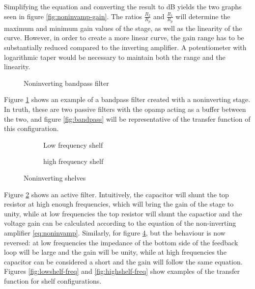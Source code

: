 Simplifying the equation and converting the result to dB yields the two graphs
seen in figure \ref{fig:noninvamp-gain}. The ratios $\frac{R_2}{R_p}$ and
$\frac{R_1}{R_p}$ will determine the maximum and minimum gain values of the
stage, as well as the linearity of the curve. However, in order to create a
more linear curve, the gain range has to be substantially reduced compared to
the inverting amplifier. A potentiometer with logarithmic taper would be
necessary to maintain both the range and the linearity.

\begin{figure}[H]
    \center
    
    \caption{Noninverting bandpass filter}
    \label{fig:noninvfilt}
\end{figure}

Figure \ref{fig:noninvfilt} shows an example of a bandpass filter created with
a noninverting stage. In truth, these are two passive filters with the opamp
acting as a buffer between the two, and figure \ref{fig:bandpass} will be
representative of the transfer function of this configuration.

\begin{figure}[H]
    \begin{subfigure}{\textwidth}
    \center
    
    \caption{Low frequency shelf}
    \label{fig:lowshelf}
    \end{subfigure}
    \begin{subfigure}{\textwidth}
    \center
    
    \caption{high frequency shelf}
    \label{fig:highshelf}
    \end{subfigure}
    \caption{Noninverting shelves}
\end{figure}

Figure \ref{fig:lowshelf} shows an active filter. Intuitively, the capacitor
will shunt the top resistor at high enough frequencies, which will bring the
gain of the stage to unity, while at low frequencies the top resistor will
shunt the capactior and the voltage gain can be calculated according to
the equation of the non-inverting amplifier \ref{eq:noninvamp}.
Similarly, for figure \ref{fig:highshelf}, but the
behaviour is now reversed: at low frequencies the impedance of the bottom side
of the feedback loop will be large and the gain will be unity, while at high
frequencies the capacitor can be considered a short and the gain will follow
the same equation\cite{negrescu}. Figures \ref{fig:lowshelf-freq} and \ref{fig:highshelf-freq}
show examples of the transfer function for shelf configurations.

